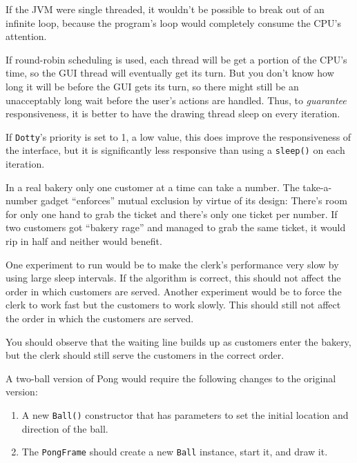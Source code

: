 \begin{ANS}
\item  If the JVM were single threaded, it wouldn't be possible to break out
of an infinite loop, because the program's loop would completely
consume the CPU's attention.


\item  If round-robin scheduling is used, each thread will be get a portion
of the CPU's time, so the GUI thread will eventually get its turn.
But you don't know how long it will be before the GUI gets its
turn, so there might still be an unacceptably long wait before the
user's actions are handled.   Thus, to {\it guarantee} responsiveness,
it is better to have the drawing thread sleep on every iteration.

\item  If {\tt Dotty}'s priority is set to 1, a low value, this
does improve the responsiveness of the interface, but it
is significantly less responsive than using a {\tt sleep()}
on each iteration.

\item  In a real bakery only one customer at a time can take a number.  The
take-a-number gadget ``enforces'' mutual exclusion by virtue of its
design: There's room for only one hand to grab the ticket and there's
only one ticket per number.  If two customers got ``bakery rage'' and
managed to grab the same ticket, it would rip in half and neither
would benefit.

\item  One experiment to run would be to make the clerk's performance very
slow by using large sleep intervals.   If the algorithm is correct,
this should not affect the order in which customers are
served.  Another experiment would be to force the clerk to work fast
but the customers to work slowly.  This should still not affect the order
in which the customers are served.

\item  You should observe that the waiting line builds up as
customers enter the bakery, but the clerk should
still serve the customers in the correct order.

\item A two-ball version of Pong would require the following
changes to the original version:
\begin{enumerate}
\item A new {\tt Ball()} constructor that has parameters to
set the initial location and direction of the ball.
\item The {\tt PongFrame} should create a new {\tt Ball}
instance, start it, and draw it.
\end{enumerate}

\end{ANS}

